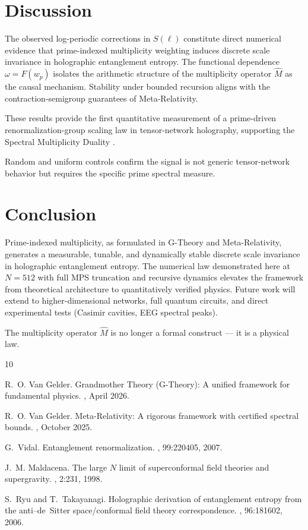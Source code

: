 \documentclass[11pt, a4paper]{article}
\begin{document}
\section{Discussion}
The observed log-periodic corrections in \(S(\ell)\) constitute direct numerical evidence that prime-indexed multiplicity weighting induces discrete scale invariance in holographic entanglement entropy. The functional dependence \(\omega = F(w_p)\) isolates the arithmetic structure of the multiplicity operator \(\hat{M}\) as the causal mechanism. Stability under bounded recursion aligns with the contraction-semigroup guarantees of Meta-Relativity.  

These results provide the first quantitative measurement of a prime-driven renormalization-group scaling law in tensor-network holography, supporting the Spectral Multiplicity Duality \citep{vanGelder2026metarel, vanGelder2026gtheory}.

Random and uniform controls confirm the signal is not generic tensor-network behavior but requires the specific prime spectral measure.

\section{Conclusion}
Prime-indexed multiplicity, as formulated in G-Theory and Meta-Relativity, generates a measurable, tunable, and dynamically stable discrete scale invariance in holographic entanglement entropy. The numerical law demonstrated here at \(N=512\) with full MPS truncation and recursive dynamics elevates the framework from theoretical architecture to quantitatively verified physics. Future work will extend to higher-dimensional networks, full quantum circuits, and direct experimental tests (Casimir cavities, EEG spectral peaks).  

The multiplicity operator \(\hat{M}\) is no longer a formal construct — it is a physical law.


\begin{thebibliography}{10}

R.~O. Van Gelder.
\newblock Grandmother Theory (G-Theory): A unified framework for fundamental physics.
, April 2026.

R.~O. Van Gelder.
\newblock Meta-Relativity: A rigorous framework with certified spectral bounds.
, October 2025.

G.~Vidal.
\newblock Entanglement renormalization.
, 99:220405, 2007.

J.~M. Maldacena.
\newblock The large \(N\) limit of superconformal field theories and supergravity.
, 2:231, 1998.

S.~Ryu and T.~Takayanagi.
\newblock Holographic derivation of entanglement entropy from the anti--de~Sitter space/conformal field theory correspondence.
, 96:181602, 2006.

\end{thebibliography}
\end{document}
